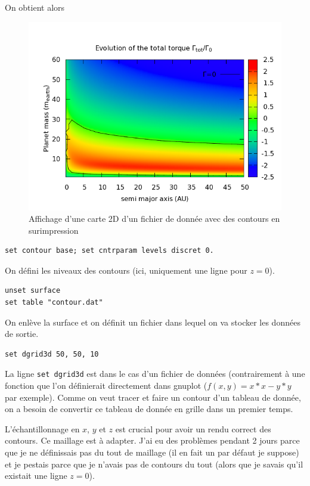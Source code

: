 \documentclass[a4paper,twoside]{article}
\begin{document}
On obtient alors 
\begin{figure}[htb]
\centering
\includegraphics[width=0.65\linewidth]{figures/pm3d-map_plus_contour.png}
\caption{Affichage d'une carte 2D d'un fichier de donnée avec des contours en surimpression}\label{fig:map_plus_contour}
\end{figure}

\bigskip
\begin{verbatim}
set contour base; set cntrparam levels discret 0.
\end{verbatim}
On défini les niveaux des contours (ici, uniquement une ligne pour $z=0$).

\begin{verbatim}
unset surface
set table "contour.dat"
\end{verbatim}
On enlève la surface et on définit un fichier dans lequel on va stocker les données de sortie.

\begin{verbatim}
set dgrid3d 50, 50, 10
\end{verbatim}
La ligne \texttt{set dgrid3d} est dans le cas d'un fichier de données (contrairement à une fonction que l'on définierait directement dans gnuplot ($f(x,y) = x*x - y*y$ par exemple). Comme on veut tracer et faire un contour d'un tableau de donnée, on a besoin de convertir ce tableau de donnée en grille dans un premier temps.

\begin{attention}
L'échantillonnage en $x$, $y$ et $z$ est crucial pour avoir un rendu correct des contours. Ce maillage est à adapter. J'ai eu des problèmes pendant 2 jours parce que je ne définissais pas du tout de maillage (il en fait un par défaut je suppose) et je pestais parce que je n'avais pas de contours du tout (alors que je savais qu'il existait une ligne $z=0$).
\end{attention}
\end{document}
